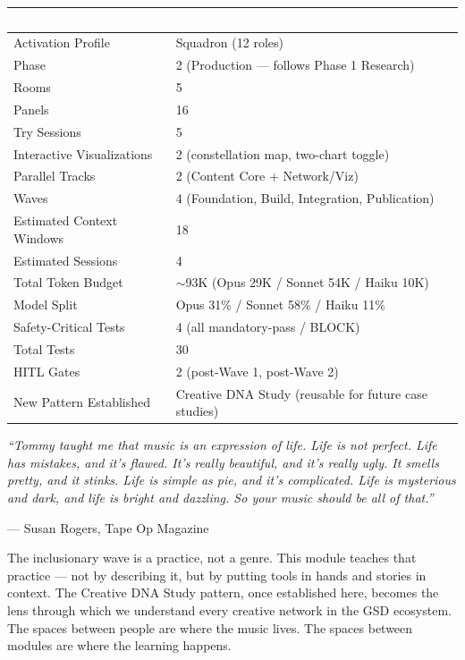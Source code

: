 \documentclass[11pt,letterpaper]{article}
\newcommand{\tableheader}[1]{\textbf{\sffamily\textcolor{white}{#1}}}
\begin{document}
\begin{center}
\begin{tabularx}{\textwidth}{L{5cm}X}
\toprule
{}
\tableheader{Metric} & \tableheader{Value} \\
\midrule
Activation Profile & Squadron (12 roles) \\
Phase & 2 (Production --- follows Phase 1 Research) \\
Rooms & 5 \\
Panels & 16 \\
Try Sessions & 5 \\
Interactive Visualizations & 2 (constellation map, two-chart toggle) \\
Parallel Tracks & 2 (Content Core + Network/Viz) \\
Waves & 4 (Foundation, Build, Integration, Publication) \\
Estimated Context Windows & 18 \\
Estimated Sessions & 4 \\
Total Token Budget & $\sim$93K (Opus 29K / Sonnet 54K / Haiku 10K) \\
Model Split & Opus 31\% / Sonnet 58\% / Haiku 11\% \\
Safety-Critical Tests & 4 (all mandatory-pass / BLOCK) \\
Total Tests & 30 \\
HITL Gates & 2 (post-Wave 1, post-Wave 2) \\
New Pattern Established & Creative DNA Study (reusable for future case studies) \\
\bottomrule
\end{tabularx}
\end{center}

\vspace{1em}

\begin{quotebox}
\textit{``Tommy taught me that music is an expression of life. Life is not perfect. Life has mistakes, and it's flawed. It's really beautiful, and it's really ugly. It smells pretty, and it stinks. Life is simple as pie, and it's complicated. Life is mysterious and dark, and life is bright and dazzling. So your music should be all of that.''}

\vspace{0.5em}
\hfill --- Susan Rogers, Tape Op Magazine

\vspace{1em}
The inclusionary wave is a practice, not a genre. This module teaches that practice --- not by describing it, but by putting tools in hands and stories in context. The Creative DNA Study pattern, once established here, becomes the lens through which we understand every creative network in the GSD ecosystem. The spaces between people are where the music lives. The spaces between modules are where the learning happens.
\end{quotebox}
\end{document}
